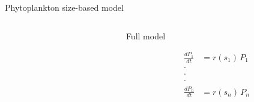 \documentclass{beamer}
\begin{document}
\begin{frame}{Phytoplankton size-based model}
{\begin{columns}[t]
\begin{column}{0.5\linewidth}
\end{column}

\begin{column}{0.5\linewidth}

\begin{block} {Full model}

\begin{eqnarray}
\frac{dP_{1}}{dt} & =  r(s_{1})\,P_{1} \nonumber \\[10pt]
\cdotp \nonumber\\[-10pt]
\cdotp \nonumber\\[-10pt]
\cdotp \nonumber\\[10pt]
\frac{dP_{n}}{dt} & =  r(s_{n})\,P_{n} \nonumber 
\end{eqnarray}

\end{block}

\end{column}

\end{columns}


}

\end{frame}
\end{document}

